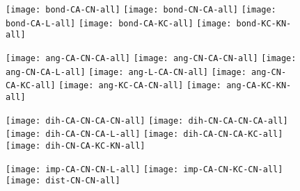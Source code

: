 \documentclass{article}
\begin{document}
\begin{figure}
  \begin{center}
    \begin{minipage}[t]{1.0\textwidth}
      \texttt{[image: bond-CA-CN-all]}
      \texttt{[image: bond-CN-CA-all]}
      \texttt{[image: bond-CA-L-all]}
      \texttt{[image: bond-CA-KC-all]}
      \texttt{[image: bond-KC-KN-all]}
    \end{minipage}
  \end{center}
\end{figure}

\begin{figure}
  \begin{center}
    \begin{minipage}[t]{1.0\textwidth}
      \texttt{[image: ang-CA-CN-CA-all]}
      \texttt{[image: ang-CN-CA-CN-all]}
      \texttt{[image: ang-CN-CA-L-all]}
      \texttt{[image: ang-L-CA-CN-all]}
      \texttt{[image: ang-CN-CA-KC-all]}
      \texttt{[image: ang-KC-CA-CN-all]}
      \texttt{[image: ang-CA-KC-KN-all]}
    \end{minipage}
  \end{center}
\end{figure}

\begin{figure}
  \begin{center}
    \begin{minipage}[t]{1.0\textwidth}
      \texttt{[image: dih-CA-CN-CA-CN-all]}
      \texttt{[image: dih-CN-CA-CN-CA-all]}
      \texttt{[image: dih-CA-CN-CA-L-all]}
      \texttt{[image: dih-CA-CN-CA-KC-all]}
      \texttt{[image: dih-CN-CA-KC-KN-all]}
    \end{minipage}
  \end{center}
\end{figure}

\begin{figure}
  \begin{center}
    \begin{minipage}[t]{1.0\textwidth}
      \texttt{[image: imp-CA-CN-CN-L-all]}
      \texttt{[image: imp-CA-CN-KC-CN-all]}
      \texttt{[image: dist-CN-CN-all]}
    \end{minipage}
  \end{center}
\end{figure}
\end{document}
